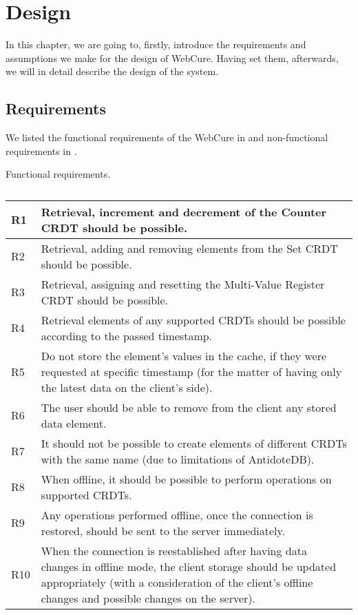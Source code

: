 \chapter{Design}
\label{Design}

In this chapter, we are going to, firstly, introduce the requirements and assumptions we make for the design of WebCure. Having set them, afterwards, we will in detail describe the design of the system.

\section{Requirements}
\label{4-Requirements}

We listed the functional requirements of the WebCure in  and non-functional requirements in .

\begin{table}[!htbp]
\centering
\caption{Functional requirements.}
\label{table:req1}
\begin{tabular}{|p{1cm}|p{14cm}|}
\hline
R1 & Retrieval, increment and decrement of the Counter CRDT should be possible.                         \\ \hline
R2 & Retrieval, adding and removing elements from the Set CRDT should be possible.                       \\ \hline
R3 & Retrieval, assigning and resetting the Multi-Value Register CRDT should be possible.               \\ \hline
R4 & Retrieval elements of any supported CRDTs should be possible according to the passed timestamp. \\ \hline
R5 & Do not store the element's values in the cache, if they were requested at specific timestamp (for the matter of having only the latest data on the client's side). \\ \hline
R6 & The user should be able to remove from the client any stored data element. \\ \hline
R7 & It should not be possible to create elements of different CRDTs with the same name (due to limitations of AntidoteDB). \\ \hline
R8 & When offline, it should be possible to perform operations on supported CRDTs. \\ \hline
R9 & Any operations performed offline, once the connection is restored, should be sent to the server immediately. \\ \hline
R10 & When the connection is reestablished after having data changes in offline mode, the client storage should be updated appropriately (with a consideration of the client's offline changes and possible changes on the server). \\ \hline
\end{tabular}
\caption*{}
\end{table}

